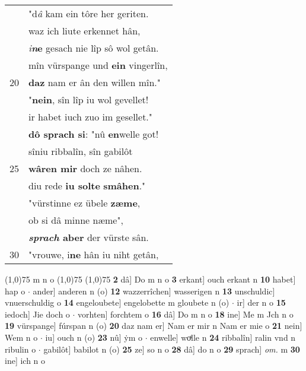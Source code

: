 \documentclass[8pt,a4paper,notitlepage]{article}
\begin{document}
\begin{table}[ht]
\begin{minipage}[t]{0.5\linewidth}
\begin{tabular}{rl}
 & "d\textit{â} kam ein tôre her geriten.\\ 
 & waz ich liute erkennet hân,\\ 
 & \textit{i}\textbf{\textit{n}e} gesach nie lîp sô wol getân.\\ 
 & mîn vürspange und \textbf{ein} vingerlîn,\\ 
20 & \textbf{daz} nam er ân den willen mîn."\\ 
 & "\textbf{nein}, sîn lîp iu wol gevellet!\\ 
 & ir habet iuch zuo im gesellet."\\ 
 & \textbf{dô sprach si}: "nû \textbf{en}welle got!\\ 
 & sîniu ribbalîn, sîn gabilôt\\ 
25 & \textbf{wâren mir} doch ze nâhen.\\ 
 & diu rede \textbf{iu solte} \textbf{smâhen}."\\ 
 & "vürstinne ez übele \textbf{zæme},\\ 
 & ob si dâ minne næme",\\ 
 & \textbf{\textit{sprach} aber} der vürste sân.\\ 
30 & "vrouwe, i\textbf{ne} hân iu niht getân,\\ 
\end{tabular}
\scriptsize
\line(1,0){75} \newline
m n o \newline
\line(1,0){75} \newline
\newline
\line(1,0){75} \newline
\textbf{2} dâ] Do m n o \textbf{3} erkant] ouch erkant n \textbf{10} habet] hap o  $\cdot$ ander] anderen n (o) \textbf{12} wazzerrîchen] wasserigen n \textbf{13} unschuldic] vnuerschuldig o \textbf{14} engeloubete] engelobette m gloubete n (o)  $\cdot$ ir] der n o \textbf{15} iedoch] Jie doch o  $\cdot$ vorhten] forchtem o \textbf{16} dâ] Do m n o \textbf{18} ine] Me m Jch n o \textbf{19} vürspange] fúrspan n (o) \textbf{20} daz nam er] Nam er mir n Nam er mie o \textbf{21} nein] Wem n o  $\cdot$ iu] ouch n (o) \textbf{23} nû] ẏm o  $\cdot$ enwelle] woͯlle n \textbf{24} ribbalîn] ralin vnd n ribulin o  $\cdot$ gabilôt] babilot n (o) \textbf{25} ze] so n o \textbf{28} dâ] do n o \textbf{29} sprach] \textit{om.} m \textbf{30} ine] ich n o \newline
\end{minipage}
\end{table}
\newpage
\end{document}

